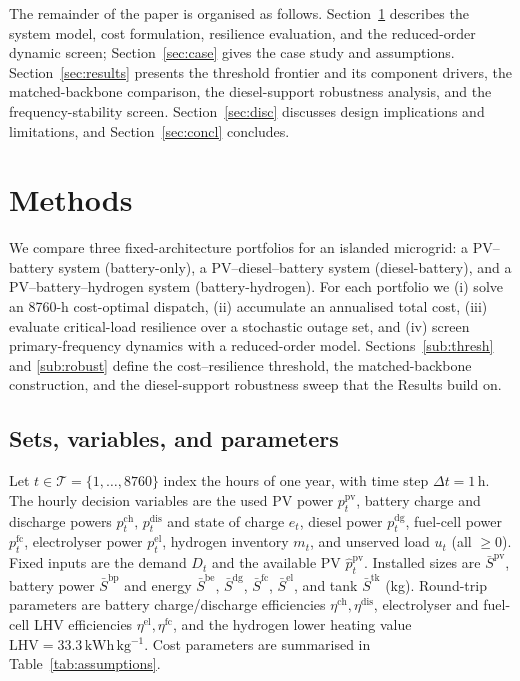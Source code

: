 \documentclass[preprint,12pt]{elsarticle}
\begin{document}
The remainder of the paper is organised as follows.
Section~\ref{sec:methods} describes the system model, cost formulation, resilience
evaluation, and the reduced-order dynamic screen; Section~\ref{sec:case} gives the
case study and assumptions. Section~\ref{sec:results} presents the threshold
frontier and its component drivers, the matched-backbone comparison, the
diesel-support robustness analysis, and the frequency-stability screen.
Section~\ref{sec:disc} discusses design implications and limitations, and
Section~\ref{sec:concl} concludes.

\section{Methods}
\label{sec:methods}

We compare three fixed-architecture portfolios for an islanded microgrid: a
PV--battery system (battery-only), a PV--diesel--battery system
(diesel-battery), and a PV--battery--hydrogen system
(battery-hydrogen). For each portfolio we (i) solve an 8760-h
cost-optimal dispatch, (ii) accumulate an annualised total cost, (iii) evaluate
critical-load resilience over a stochastic outage set, and (iv) screen
primary-frequency dynamics with a reduced-order model. Sections~\ref{sub:thresh}
and \ref{sub:robust} define the cost--resilience threshold, the matched-backbone
construction, and the diesel-support robustness sweep that the Results build on.

\subsection{Sets, variables, and parameters}
Let $t \in \mathcal{T}=\{1,\dots,8760\}$ index the hours of one year, with time
step $\Delta t = 1\,\mathrm{h}$. The hourly decision variables are the used PV
power $p^{\mathrm{pv}}_t$, battery charge and discharge powers
$p^{\mathrm{ch}}_t,\,p^{\mathrm{dis}}_t$ and state of charge $e_t$, diesel power
$p^{\mathrm{dg}}_t$, fuel-cell power $p^{\mathrm{fc}}_t$, electrolyser power
$p^{\mathrm{el}}_t$, hydrogen inventory $m_t$, and unserved load $u_t$ (all
$\ge 0$). Fixed inputs are the demand $D_t$ and the available PV
$\hat{p}^{\mathrm{pv}}_t$. Installed sizes are $\bar S^{\mathrm{pv}}$, battery
power $\bar S^{\mathrm{bp}}$ and energy $\bar S^{\mathrm{be}}$,
$\bar S^{\mathrm{dg}}$, $\bar S^{\mathrm{fc}}$, $\bar S^{\mathrm{el}}$, and tank
$\bar S^{\mathrm{tk}}$ (kg). Round-trip parameters are battery charge/discharge
efficiencies $\eta^{\mathrm{ch}},\eta^{\mathrm{dis}}$, electrolyser and fuel-cell
LHV efficiencies $\eta^{\mathrm{el}},\eta^{\mathrm{fc}}$, and the hydrogen lower
heating value $\mathrm{LHV}=33.3\,\mathrm{kWh\,kg^{-1}}$. Cost parameters are
summarised in Table~\ref{tab:assumptions}.
\end{document}
